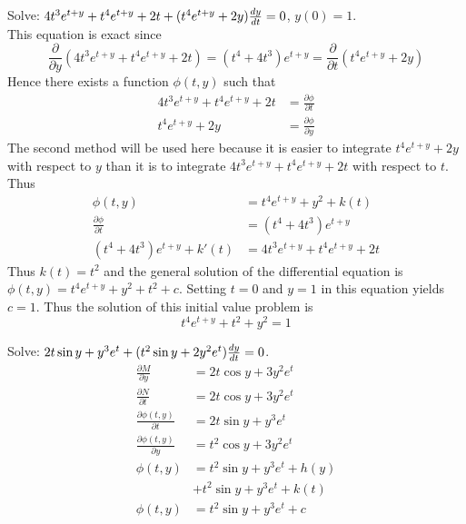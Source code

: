 \documentclass[12pt]{article}
\begin{document}
\begin{example} Solve: $4t^3e^{t + y} + t^4e^{t + y} + 2t + (t^4e^{t + y} + 2y)\frac{dy}{dt} = 0$, $y(0) = 1$. \\ This equation is exact since $$\frac{\partial}{\partial y}(4t^3e^{t + y} + t^4e^{t + y} + 2t) = (t^4 + 4t^3)e^{t + y} = \frac{\partial}{\partial t}(t^4e^{t + y} + 2y) $$ Hence there exists a function $\phi(t, y)$ such that $$\begin{aligned} 4t^3e^{t + y} + t^4e^{t + y} + 2t &= \frac{\partial \phi}{\partial t} \\ t^4e^{t + y} + 2y &= \frac{\partial \phi}{\partial y} \end{aligned} $$ 
The second method will be used here because it is easier to integrate $t^4e^{t + y} + 2y$ with respect to $y$ than it is to integrate $4t^3e^{t + y} + t^4e^{t + y} + 2t$ with respect to $t$. Thus $$\begin{aligned} \phi(t, y) &= t^4e^{t + y} + y^2 + k(t) \\ \frac{\partial \phi}{\partial t} &= (t^4 + 4t^3)e^{t + y} \\ (t^4 + 4t^3)e^{t + y} + k'(t) &= 4t^3e^{t + y} + t^4e^{t + y} + 2t \end{aligned} $$ Thus $k(t) = t^2$ and the general solution of the differential equation is $\phi(t, y) = t^4e^{t + y} + y^2 + t^2 + c$. Setting $t = 0$ and $y = 1$ in this equation yields $c = 1$. Thus the solution of this initial value problem is $$t^4e^{t + y} + t^2 + y^2 = 1$$ \end{example} 
\begin{example} Solve: $2t\sin y + y^3e^t + (t^2\sin y + 2y^2e^t)\frac{dy}{dt} = 0 $.
$$\begin{aligned} \frac{\partial M}{\partial y} &= 2t\cos y + 3y^2e^t \\ \frac{\partial N}{\partial t} &= 2t\cos y + 3y^2e^t \\ \frac{\partial \phi(t, y)}{\partial t} &= 2t\sin y + y^3e^t \\ \frac{\partial \phi(t, y)}{\partial y} &= t^2\cos y + 3y^2e^t \\ \phi(t, y) &= t^2\sin y + y^3e^t + h(y) \\ &+ t^2\sin y + y^3e^t + k(t) \\ \phi(t, y) &= t^2\sin y + y^3e^t + c \end{aligned} $$  \end{example}
\end{document}
